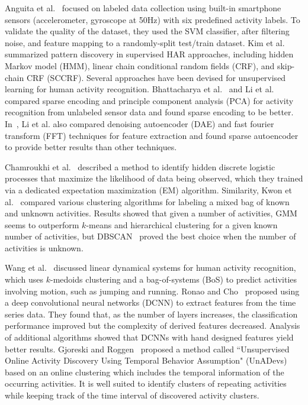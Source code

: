Anguita et al.~\cite{anguita2013} focused on labeled data collection using built-in smartphone sensors (accelerometer, gyroscope at 50Hz) with six predefined activity labels. To validate the quality of the dataset, they used the SVM classifier, after filtering noise, and feature mapping to a randomly-split test/train dataset. Kim et al.~\cite{kim2010} summarized pattern discovery in supervised HAR approaches, including hidden Markov model (HMM), linear chain conditional random fields (CRF), and skip-chain CRF (SCCRF).
Several approaches have been devised for unsupervised learning for human activity recognition. Bhattacharya et al.~\cite{bhattacharya2014} and Li et al.~\cite{yongmou2014} compared sparse encoding and principle component analysis (PCA) for activity recognition from unlabeled sensor data and found sparse encoding to be better. In~\cite{yongmou2014}, Li et al. also compared denoising autoencoder (DAE) and fast fourier transform (FFT) techniques for feature extraction and found sparse autoencoder to provide better results than other techniques.

Chamroukhi et al.~\cite{chamroukhi2013} described a method to identify hidden discrete logistic processes that maximize the likelihood of data being observed, which they trained via a dedicated expectation maximization (EM) algorithm. Similarity, Kwon et al.~\cite{kwon2014} compared various clustering algorithms for labeling a mixed bag of known and unknown activities. Results showed that given a number of activities, GMM seems to outperform $k$-means and hierarchical clustering for a given known number of activities, but DBSCAN~\cite{ester1996} proved the best choice when the number of activities is unknown.

Wang et al.~\cite{wang2014} discussed linear dynamical systems for human activity recognition, which uses $k$-medoids clustering and a bag-of-systems (BoS) to predict activities involving motion, such as jumping and running. Ronao and Cho~\cite{ronao2015} proposed using a deep convolutional neural networks (DCNN) to extract features from the time series data. They found that, as the number of layers increases, the classification performance improved but the complexity of derived features decreased. Analysis of additional algorithms showed that DCNNs with hand designed features yield better results. Gjoreski and Roggen~\cite{gjoreski2017} proposed a method called ``Unsupervised Online Activity Discovery Using Temporal Behavior Assumption" (UnADevs) based on an online clustering which includes the temporal information of the occurring activities. It is well suited to identify clusters of repeating activities while keeping track of the time interval of discovered activity clusters.

